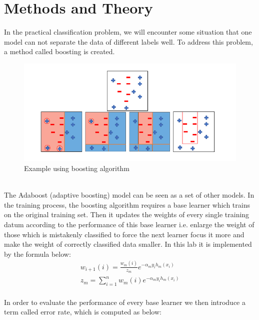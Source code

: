 \documentclass[journal, a4paper]{IEEEtran}
\begin{document}
\section{Methods and Theory}
In the practical classification problem, we will encounter some situation that one model can not separate the data of different labels well. To address this problem, a method called boosting is created. 
\begin{figure}[!hbt]
	\begin{center}
	\includegraphics[width=\columnwidth]{intro_boosting.png}
	\caption{Example using boosting algorithm}
	\label{fig1}
	\end{center}
\end{figure}\\
The Adaboost (adaptive boosting) model can be seen as a set of other models. In the training process, the boosting algorithm requires a base learner which trains on the original training set. Then it updates the weights of every single training datum according to the performance of this base learner i.e. enlarge the weight of those which is mistakenly classified to force the next learner focus it more and make the weight of correctly classified data smaller. In this lab it is implemented by the formula below:
\begin{align}
    w_{i+1} (i) = \frac{w_m(i)}{z_m} e^{-\alpha_my_ih_m(x_i)} \\
    z_m = \sum_{i=1}^n w_m(i) e^{-\alpha_my_ih_m(x_i)}
\end{align}\\
In order to evaluate the performance of every base learner we then introduce a term called error rate, which is computed as below:
\end{document}
